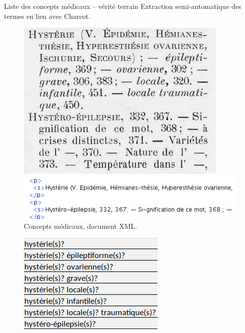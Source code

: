 \begin{frame}{Liste des concepts médicaux -- vérité terrain}
	Extraction semi-automatique des termes en lien avec Charcot.
	
	\begin{figure}[!htb]
		\centering
		\begin{minipage}{.5\textwidth}
			\centering
			\includegraphics[width=0.6\linewidth, height=0.3\textheight]{pic/concepts-pdf}
			\caption{Index des termes \parencite{charcot1892oeuvres}.}
			\label{fig:prob1_6_2}
		\end{minipage}%
		\begin{minipage}{.5\textwidth}
			\centering
			\includegraphics[width=1\linewidth, height=0.15\textheight]{pic/concepts-xml}
			\caption{Concepts médicaux, document XML.}
			\label{fig:prob1_6_1}
		\end{minipage}
	\end{figure}
	\begin{figure}[!htb]
		\centering
		\begin{minipage}{.5\textwidth}
			\centering
			\includegraphics[width=0.6\linewidth, height=0.25\textheight]{pic/concepts-csv}

\end{minipage}
\end{figure}
\end{frame}
